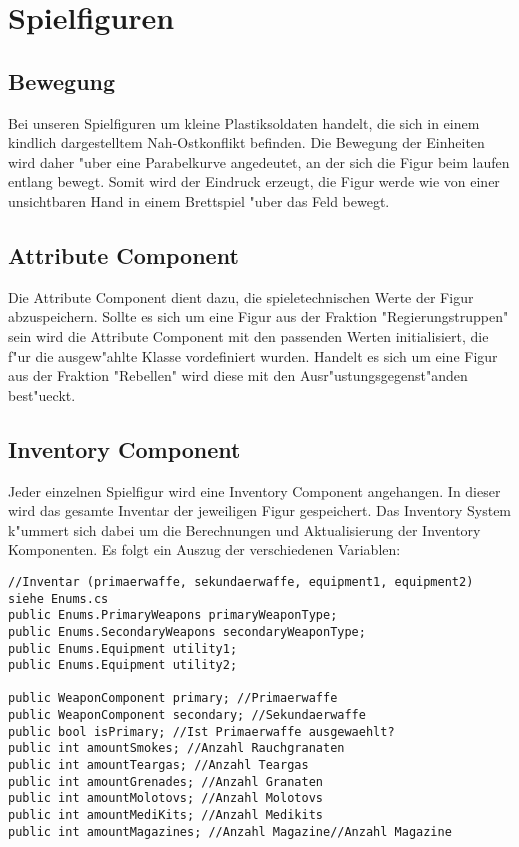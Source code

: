 \chapter{Spielfiguren}

\section{Bewegung}
Bei unseren Spielfiguren um kleine Plastiksoldaten handelt, die sich in einem kindlich dargestelltem Nah-Ostkonflikt befinden. Die Bewegung der Einheiten wird daher "uber eine Parabelkurve angedeutet, an der sich die Figur beim laufen entlang bewegt. Somit wird der Eindruck erzeugt, die Figur werde wie von einer unsichtbaren Hand in einem Brettspiel "uber das Feld bewegt.

\section{Attribute Component}
Die Attribute Component dient dazu, die spieletechnischen Werte der Figur abzuspeichern. Sollte es sich um eine Figur aus der Fraktion "Regierungstruppen" sein wird die Attribute Component mit den passenden Werten initialisiert, die f"ur die ausgew"ahlte Klasse vordefiniert wurden. Handelt es sich um eine Figur aus der Fraktion "Rebellen" wird diese mit den Ausr"ustungsgegenst"anden best"ueckt. 


\section{Inventory Component}
Jeder einzelnen Spielfigur wird eine Inventory Component angehangen. In dieser wird das gesamte Inventar der jeweiligen Figur gespeichert. Das Inventory System k"ummert sich dabei um die Berechnungen und Aktualisierung der Inventory Komponenten.\newline
Es folgt ein Auszug der verschiedenen Variablen:\newline

\begin{lstlisting}[breaklines = true]
//Inventar (primaerwaffe, sekundaerwaffe, equipment1, equipment2) siehe Enums.cs    
public Enums.PrimaryWeapons primaryWeaponType;
public Enums.SecondaryWeapons secondaryWeaponType;
public Enums.Equipment utility1;
public Enums.Equipment utility2;

public WeaponComponent primary; //Primaerwaffe
public WeaponComponent secondary; //Sekundaerwaffe
public bool isPrimary; //Ist Primaerwaffe ausgewaehlt? 
public int amountSmokes; //Anzahl Rauchgranaten
public int amountTeargas; //Anzahl Teargas
public int amountGrenades; //Anzahl Granaten
public int amountMolotovs; //Anzahl Molotovs
public int amountMediKits; //Anzahl Medikits
public int amountMagazines; //Anzahl Magazine//Anzahl Magazine
\end{lstlisting}

